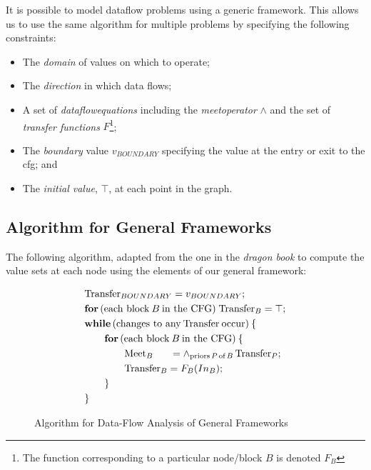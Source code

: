 \documentclass[bsc,twoside,singlespacing,parskip,logo,notimes,normalheadings]{infthesis}
\begin{document}
    It is possible to model \gls{dataflow} problems using a generic
    framework. This allows us to use the same algorithm for multiple
    problems by specifying the following constraints\cite[p. 680]{dragonbook}:

    \begin{itemize}
      \item The {\em \gls{domain}} of values on which to operate;
      \item The {\em \gls{direction}} in which data flows;
      \item A set of {\em \gls{dataflowequations}} including the {\em
          \gls{meetoperator}} $\land$ and the set of {\em
          \gls{transfer} functions} $F$\footnote{The function
          corresponding to a particular node/block $B$ is denoted $F_{B}$};
      \item The {\em \gls{boundary}} value $v_{BOUNDARY}$ specifying
        the value at the entry or exit to the \gls{cfg}; and
      \item The {\em initial value}, $\top$, at each point in the graph.
      \end{itemize}

          \subsection{Algorithm for General Frameworks}

          The following algorithm, adapted from the one in the {\em
            dragon book}\cite[p. 691]{dragonbook} to compute the value
          sets at each node using the elements of our general
          framework:

          \begin{figure}[!ht]
            \centering
            \vspace{-5mm}
            \begin{align*}
              & \text{Transfer}_{BOUNDARY} = v_{BOUNDARY};\\
              & {\bf for} \, ( \text{each block} \: B \: \text{in the CFG} ) \; \text{Transfer}_{B} = \top;\\
              & {\bf while} \, ( \text{changes to any} \: \text{Transfer} \: \text{occur} ) \: \{\\
              & \quad \quad {\bf for} \, (\text{each block} \: B \: \text{in the CFG} ) \: \{\\
              & \quad \quad \quad \quad \text{Meet}_{B} \hspace{0.59cm} = \land_{\text{priors} \, P \, \text{of} \,  B} \, \text{Transfer}_{P};\\
              & \quad \quad \quad \quad \text{Transfer}_{B} = F_{B}(In_{B});\\
              & \quad \quad \}\\
              & \}
            \end{align*}
            \caption{Algorithm for Data-Flow Analysis of General Frameworks}
          \end{figure}
\end{document}
